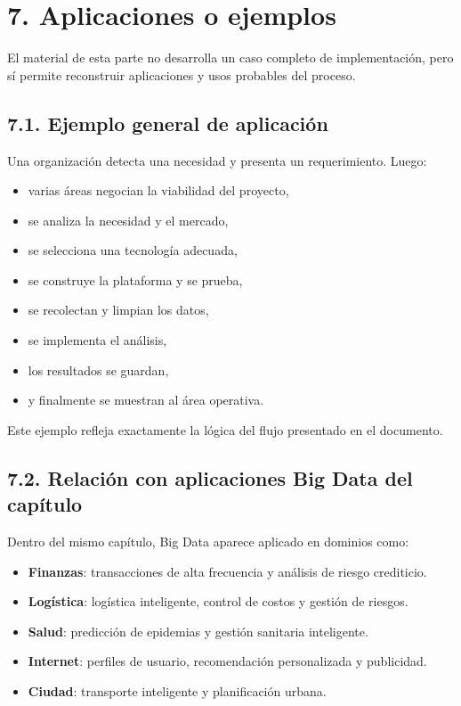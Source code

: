 \documentclass[8pt,a4paper,twocolumn]{article}
\begin{document}
\section*{7. Aplicaciones o ejemplos}

El material de esta parte no desarrolla un caso completo de implementación, pero sí permite reconstruir aplicaciones y usos probables del proceso.

\subsection*{7.1. Ejemplo general de aplicación}

Una organización detecta una necesidad y presenta un requerimiento. Luego:

\begin{itemize}[leftmargin=*]
    \item varias áreas negocian la viabilidad del proyecto,
    \item se analiza la necesidad y el mercado,
    \item se selecciona una tecnología adecuada,
    \item se construye la plataforma y se prueba,
    \item se recolectan y limpian los datos,
    \item se implementa el análisis,
    \item los resultados se guardan,
    \item y finalmente se muestran al área operativa.
\end{itemize}

Este ejemplo refleja exactamente la lógica del flujo presentado en el documento.

\subsection*{7.2. Relación con aplicaciones Big Data del capítulo}

Dentro del mismo capítulo, Big Data aparece aplicado en dominios como:

\begin{itemize}[leftmargin=*]
    \item \textbf{Finanzas}: transacciones de alta frecuencia y análisis de riesgo crediticio.
    \item \textbf{Logística}: logística inteligente, control de costos y gestión de riesgos.
    \item \textbf{Salud}: predicción de epidemias y gestión sanitaria inteligente.
    \item \textbf{Internet}: perfiles de usuario, recomendación personalizada y publicidad.
    \item \textbf{Ciudad}: transporte inteligente y planificación urbana.
\end{itemize}
\end{document}

